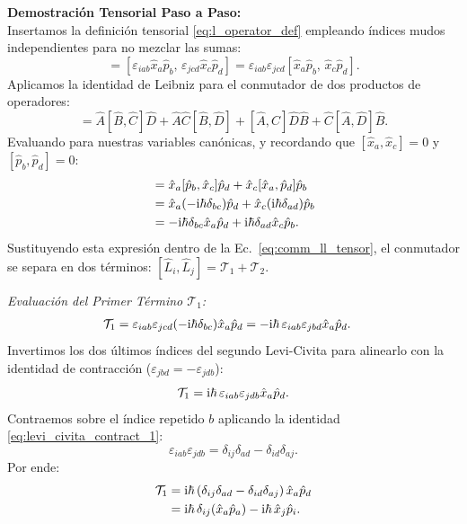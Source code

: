 \textbf{Demostración Tensorial Paso a Paso:}\\
Insertamos la definición tensorial \eqref{eq:l_operator_def} empleando índices mudos independientes para no mezclar las sumas:
\begin{equation}
    [\hat{L}_i, \hat{L}_j] = \left[\varepsilon_{iab}\hat{x}_a\hat{p}_b, \, \varepsilon_{jcd}\hat{x}_c\hat{p}_d\right] = \varepsilon_{iab}\varepsilon_{jcd}\left[\hat{x}_a\hat{p}_b, \, \hat{x}_c\hat{p}_d\right].
    \label{eq:comm_ll_tensor}
\end{equation}
Aplicamos la identidad de Leibniz para el conmutador de dos productos de operadores:
\begin{equation}
    [\hat{A}\hat{B}, \hat{C}\hat{D}] = \hat{A}[\hat{B}, \hat{C}]\hat{D} + \hat{A}\hat{C}[\hat{B}, \hat{D}] + [\hat{A}, \hat{C}]\hat{D}\hat{B} + \hat{C}[\hat{A}, \hat{D}]\hat{B}.
\end{equation}
Evaluando para nuestras variables canónicas, y recordando que $[\hat{x}_a, \hat{x}_c] = 0$ y $[\hat{p}_b, \hat{p}_d] = 0$:
\begin{align}
    [\hat{x}_a\hat{p}_b, \, \hat{x}_c\hat{p}_d] &= \hat{x}_a [\hat{p}_b, \hat{x}_c]\hat{p}_d + \hat{x}_c [\hat{x}_a, \hat{p}_d]\hat{p}_b \nonumber\\
    &= \hat{x}_a(-\iu\hbar\delta_{bc})\hat{p}_d + \hat{x}_c(\iu\hbar\delta_{ad})\hat{p}_b \nonumber\\
    &= -\iu\hbar\delta_{bc}\hat{x}_a\hat{p}_d + \iu\hbar\delta_{ad}\hat{x}_c\hat{p}_b.
    \label{eq:leibniz_expansion}
\end{align}
Sustituyendo esta expresión dentro de la Ec.~\eqref{eq:comm_ll_tensor}, el conmutador se separa en dos términos: $[\hat{L}_i, \hat{L}_j] = \mathcal{T}_1 + \mathcal{T}_2$.

\textit{Evaluación del Primer Término $\mathcal{T}_1$:}
\begin{align}
    \mathcal{T}_1 &= \varepsilon_{iab}\varepsilon_{jcd}(-\mathrm{i}\hbar\delta_{bc})\hat{x}_a\hat{p}_d = -\mathrm{i}\hbar\,\varepsilon_{iab}\varepsilon_{jbd}\hat{x}_a\hat{p}_d.
\end{align}
Invertimos los dos últimos índices del segundo Levi-Civita para alinearlo con la identidad de contracción ($\varepsilon_{jbd} = -\varepsilon_{jdb}$):
\begin{equation}
    \mathcal{T}_1 = \mathrm{i}\hbar\,\varepsilon_{iab}\varepsilon_{jdb}\hat{x}_a\hat{p}_d.
\end{equation}
Contraemos sobre el índice repetido $b$ aplicando la identidad \eqref{eq:levi_civita_contract_1}:
\begin{equation}
    \varepsilon_{iab}\varepsilon_{jdb} = \delta_{ij}\delta_{ad} - \delta_{id}\delta_{aj}.
\end{equation}
Por ende:
\begin{align}
    \mathcal{T}_1 &= \mathrm{i}\hbar\left(\delta_{ij}\delta_{ad} - \delta_{id}\delta_{aj}\right)\hat{x}_a\hat{p}_d \nonumber\\
    &= \mathrm{i}\hbar\,\delta_{ij}(\hat{x}_a\hat{p}_a) - \mathrm{i}\hbar\,\hat{x}_j\hat{p}_i.
    \label{eq:t1_eval}
\end{align}

